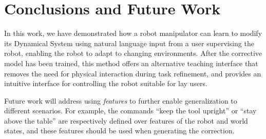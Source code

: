 \section{Conclusions and Future Work}
\label{secConclusions}


In this work, we have demonstrated how a robot manipulator can learn to modify its Dynamical System using natural language input from a user supervising the robot, enabling the robot to adapt to changing environments.
After the corrective model has been trained, this method offers an alternative teaching interface
that removes the need for physical interaction during task refinement, and provides an intuitive interface for controlling the robot suitable for lay users.

Future work will address using \emph{features} to further enable generalization to different scenarios.
For example, the commands ``keep the tool upright'' or ``stay above the table'' are respectively defined over features of the robot and world states, and these features should be used when generating the correction.

